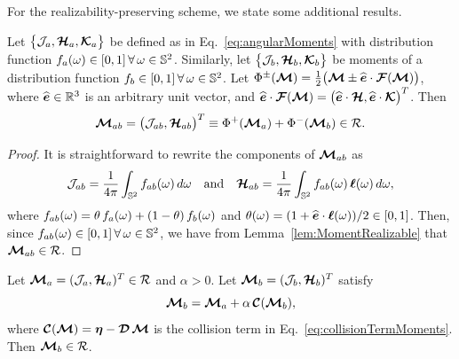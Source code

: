 For the realizability-preserving scheme, we state some additional results.  
\begin{lemma}
  Let $\big\{\mathcal{J}_{a},\boldsymbol{\mathcal{H}}_{a},\boldsymbol{\mathcal{K}}_{a}\big\}$ be defined as in Eq.~\eqref{eq:angularMoments} with distribution function $f_{a}(\omega)\in[0,1]\,\forall\,\omega\in\mathbb{S}^{2}$.  
  Similarly, let $\big\{\mathcal{J}_{b},\boldsymbol{\mathcal{H}}_{b},\boldsymbol{\mathcal{K}}_{b}\big\}$ be moments of a distribution function $f_{b}\in[0,1]\,\forall\,\omega\in\mathbb{S}^{2}$.  
  Let $\Phi^{\pm}(\boldsymbol{\mathcal{M}})=\frac{1}{2}\big(\boldsymbol{\mathcal{M}}\pm\widehat{\boldsymbol{e}}\cdot\boldsymbol{\mathcal{F}}(\boldsymbol{\mathcal{M}})\big)$, where $\widehat{\boldsymbol{e}}\in\mathbb{R}^{3}$ is an arbitrary unit vector, and $\widehat{\boldsymbol{e}}\cdot\boldsymbol{\mathcal{F}}(\boldsymbol{\mathcal{M}})=\big(\widehat{\boldsymbol{e}}\cdot\boldsymbol{\mathcal{H}},\widehat{\boldsymbol{e}}\cdot\boldsymbol{\mathcal{K}}\big)^{T}$.  
  Then
  \begin{equation*}
    \boldsymbol{\mathcal{M}}_{ab} = \big(\mathcal{J}_{ab},\boldsymbol{\mathcal{H}}_{ab}\big)^{T} \equiv \Phi^{+}(\boldsymbol{\mathcal{M}}_{a})+\Phi^{-}(\boldsymbol{\mathcal{M}}_{b})\in\mathcal{R}.
  \end{equation*}
  \label{lem:explicitStep}
\end{lemma}
\begin{proof}
  It is straightforward to rewrite the components of $\boldsymbol{\mathcal{M}}_{ab}$ as
  \begin{equation*}
    \mathcal{J}_{ab}=\frac{1}{4\pi}\int_{\mathbb{S}^{2}}f_{ab}(\omega)\,d\omega
    \quad\text{and}\quad
    \boldsymbol{\mathcal{H}}_{ab}=\frac{1}{4\pi}\int_{\mathbb{S}^{2}}f_{ab}(\omega)\,\boldsymbol{\ell}(\omega)\,d\omega,
  \end{equation*}
  where $f_{ab}(\omega)=\theta\,f_{a}(\omega)+(1-\theta)\,f_{b}(\omega)$ and $\theta(\omega)=(1+\widehat{\boldsymbol{e}}\cdot\boldsymbol{\ell}(\omega))/2\in[0,1]$.  
  Then, since $f_{ab}(\omega)\in[0,1]\,\forall\,\omega\in\mathbb{S}^{2}$, we have from Lemma~\ref{lem:MomentRealizable} that $\boldsymbol{\mathcal{M}}_{ab}\in\mathcal{R}$.  
\end{proof}

\begin{lemma}
  Let $\boldsymbol{\mathcal{M}}_{a}=(\mathcal{J}_{a},\boldsymbol{\mathcal{H}}_{a})^{T}\in\mathcal{R}$ and $\alpha>0$.  
  Let $\boldsymbol{\mathcal{M}}_{b}=(\mathcal{J}_{b},\boldsymbol{\mathcal{H}}_{b})^{T}$ satisfy
  \begin{equation*}
    \boldsymbol{\mathcal{M}}_{b}=\boldsymbol{\mathcal{M}}_{a}+\alpha\,\boldsymbol{\mathcal{C}}(\boldsymbol{\mathcal{M}}_{b}), 
  \end{equation*}
  where $\boldsymbol{\mathcal{C}}(\boldsymbol{\mathcal{M}})=\boldsymbol{\eta}-\boldsymbol{\mathcal{D}}\,\boldsymbol{\mathcal{M}}$ is the collision term in Eq.~\eqref{eq:collisionTermMoments}.  
  Then $\boldsymbol{\mathcal{M}}_{b}\in\mathcal{R}$.  
  \label{lem:implicitStep}
\end{lemma}

